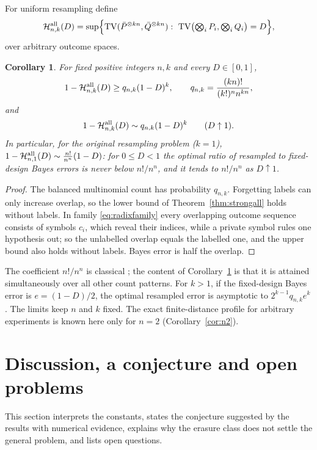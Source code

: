 \documentclass[11pt,a4paper]{article}
\newtheorem{corollary}[theorem]{Corollary}
\theoremstyle{definition}\newtheorem{definition}[theorem]{Definition}
\theoremstyle{remark}\newtheorem{remark}[theorem]{Remark}
\newcommand{\TV}{\operatorname{TV}}
\begin{document}
For uniform resampling define
\[
\mathcal H_{n,k}^{\rm all}(D)=\sup\Bigl\{\TV(\bar P^{\otimes kn},\bar Q^{\otimes kn}):\ \TV\bigl(\textstyle\bigotimes_iP_i,\bigotimes_iQ_i\bigr)=D\Bigr\},
\]
over arbitrary outcome spaces.
\begin{corollary}\label{cor:uniformstrong}
For fixed positive integers $n,k$ and every $D\in[0,1]$,
\[
1-\mathcal H_{n,k}^{\rm all}(D)\ge q_{n,k}(1-D)^k,\qquad q_{n,k}=\frac{(kn)!}{(k!)^n n^{kn}},
\]
and
\begin{equation}\label{eq:uniformstrong}
1-\mathcal H_{n,k}^{\rm all}(D)
\sim q_{n,k}(1-D)^k
\qquad(D\uparrow1).
\end{equation}
In particular, for the original resampling problem ($k=1$), $1-\mathcal H_{n,1}^{\rm all}(D)\sim\frac{n!}{n^n}(1-D)$: for $0\le D<1$ the optimal ratio of resampled to fixed-design Bayes errors is never below $n!/n^n$, and it tends to $n!/n^n$ as $D\uparrow1$.
\end{corollary}
\begin{proof}
The balanced multinomial count has probability $q_{n,k}$. Forgetting labels can only increase overlap, so the lower bound of Theorem~\ref{thm:strongall} holds without labels. In family \eqref{eq:radixfamily} every overlapping outcome sequence consists of symbols $c_i$, which reveal their indices, while a private symbol rules one hypothesis out; so the unlabelled overlap equals the labelled one, and the upper bound also holds without labels. Bayes error is half the overlap.
\end{proof}
The coefficient $n!/n^n$ is classical \cite{Sampling}; the content of Corollary~\ref{cor:uniformstrong} is that it is attained simultaneously over all other count patterns. For $k>1$, if the fixed-design Bayes error is $e=(1-D)/2$, the optimal resampled error is asymptotic to $2^{k-1}q_{n,k}e^k$. The limits keep $n$ and $k$ fixed. The exact finite-distance profile for arbitrary experiments is known here only for $n=2$ (Corollary~\ref{cor:n2}).

\section{Discussion, a conjecture and open problems}\label{sec:discussion}
This section interprets the constants, states the conjecture suggested by the results with numerical evidence, explains why the erasure class does not settle the general problem, and lists open questions.
\end{document}
